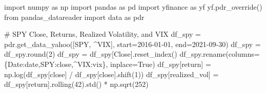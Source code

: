 \documentclass[
  letterpaper,
  DIV=11,
  numbers=noendperiod]{scrreprt}
\newenvironment{Shaded}{\begin{snugshade}}{\end{snugshade}}
\newcommand{\BuiltInTok}[1]{\textcolor[rgb]{0.00,0.23,0.31}{#1}}
\newcommand{\CommentTok}[1]{\textcolor[rgb]{0.37,0.37,0.37}{#1}}
\newcommand{\DecValTok}[1]{\textcolor[rgb]{0.68,0.00,0.00}{#1}}
\newcommand{\ImportTok}[1]{\textcolor[rgb]{0.00,0.46,0.62}{#1}}
\newcommand{\NormalTok}[1]{\textcolor[rgb]{0.00,0.23,0.31}{#1}}
\newcommand{\OperatorTok}[1]{\textcolor[rgb]{0.37,0.37,0.37}{#1}}
\newcommand{\StringTok}[1]{\textcolor[rgb]{0.13,0.47,0.30}{#1}}
\newcommand{\VariableTok}[1]{\textcolor[rgb]{0.07,0.07,0.07}{#1}}
\begin{document}
\begin{Shaded}
\begin{Highlighting}[]
\ImportTok{import}\NormalTok{ numpy }\ImportTok{as}\NormalTok{ np}
\ImportTok{import}\NormalTok{ pandas }\ImportTok{as}\NormalTok{ pd}
\ImportTok{import}\NormalTok{ yfinance }\ImportTok{as}\NormalTok{ yf}
\NormalTok{yf.pdr\_override()}
\ImportTok{from}\NormalTok{ pandas\_datareader }\ImportTok{import}\NormalTok{ data }\ImportTok{as}\NormalTok{ pdr}

\CommentTok{\# SPY Close, Returns, Realized Volatility, and VIX}
\NormalTok{df\_spy }\OperatorTok{=}\NormalTok{ pdr.get\_data\_yahoo([}\StringTok{\textquotesingle{}SPY\textquotesingle{}}\NormalTok{, }\StringTok{\textquotesingle{}\^{}VIX\textquotesingle{}}\NormalTok{], start}\OperatorTok{=}\StringTok{\textquotesingle{}2016{-}01{-}01\textquotesingle{}}\NormalTok{, end}\OperatorTok{=}\StringTok{\textquotesingle{}2021{-}09{-}30\textquotesingle{}}\NormalTok{)}
\NormalTok{df\_spy }\OperatorTok{=}\NormalTok{ df\_spy.}\BuiltInTok{round}\NormalTok{(}\DecValTok{2}\NormalTok{)}
\NormalTok{df\_spy }\OperatorTok{=}\NormalTok{ df\_spy[}\StringTok{\textquotesingle{}Close\textquotesingle{}}\NormalTok{].reset\_index()}
\NormalTok{df\_spy.rename(columns}\OperatorTok{=}\NormalTok{\{}\StringTok{\textquotesingle{}Date\textquotesingle{}}\NormalTok{:}\StringTok{\textquotesingle{}date\textquotesingle{}}\NormalTok{,}\StringTok{\textquotesingle{}SPY\textquotesingle{}}\NormalTok{:}\StringTok{\textquotesingle{}close\textquotesingle{}}\NormalTok{,}\StringTok{\textquotesingle{}\^{}VIX\textquotesingle{}}\NormalTok{:}\StringTok{\textquotesingle{}vix\textquotesingle{}}\NormalTok{\}, inplace}\OperatorTok{=}\VariableTok{True}\NormalTok{)}
\NormalTok{df\_spy[}\StringTok{\textquotesingle{}return\textquotesingle{}}\NormalTok{] }\OperatorTok{=}\NormalTok{ np.log(df\_spy[}\StringTok{\textquotesingle{}close\textquotesingle{}}\NormalTok{] }\OperatorTok{/}\NormalTok{ df\_spy[}\StringTok{\textquotesingle{}close\textquotesingle{}}\NormalTok{].shift(}\DecValTok{1}\NormalTok{))}
\NormalTok{df\_spy[}\StringTok{\textquotesingle{}realized\_vol\textquotesingle{}}\NormalTok{] }\OperatorTok{=}\NormalTok{ df\_spy[}\StringTok{\textquotesingle{}return\textquotesingle{}}\NormalTok{].rolling(}\DecValTok{42}\NormalTok{).std() }\OperatorTok{*}\NormalTok{ np.sqrt(}\DecValTok{252}\NormalTok{)}


\end{Highlighting}
\end{Shaded}
\end{document}
